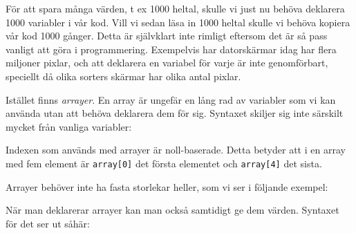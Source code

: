 För att spara många värden, t ex 1000 heltal, skulle vi just nu behöva deklarera 1000 variabler i vår kod. Vill vi sedan läsa in 1000 heltal skulle vi behöva kopiera vår kod 1000 gånger. Detta är självklart inte rimligt eftersom det är så pass vanligt att göra i programmering.  Exempelvis har datorskärmar idag har flera miljoner pixlar, och att deklarera en variabel för varje är inte genomförbart, speciellt då olika sorters skärmar har olika antal pixlar. 

Istället finns \emph{arrayer}. En array är ungefär en lång rad av variabler som vi kan använda utan att behöva deklarera dem för sig. Syntaxet skiljer sig inte särskilt mycket från vanliga variabler:



Indexen som används med arrayer är noll-baserade. Detta betyder att i en array med fem element är \texttt{array[0]} det första elementet och \texttt{array[4]} det sista.

Arrayer behöver inte ha fasta storlekar heller, som vi ser i följande exempel:



När man deklarerar arrayer kan man också samtidigt ge dem värden. Syntaxet för det ser ut såhär:


